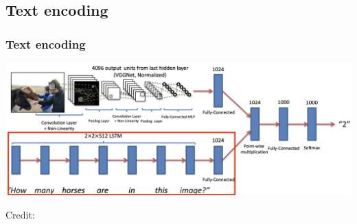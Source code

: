 \documentclass{beamer}
\begin{document}
\subsection{Text encoding}
\begin{frame}
\frametitle{Text encoding}
\begin{center}
\includegraphics[scale=0.27]{./images/TextEncoding}
\end{center}
\begin{center}
\hspace*{12pt}\hbox{\scriptsize Credit:}
\end{center}
\end{frame}
\end{document}
